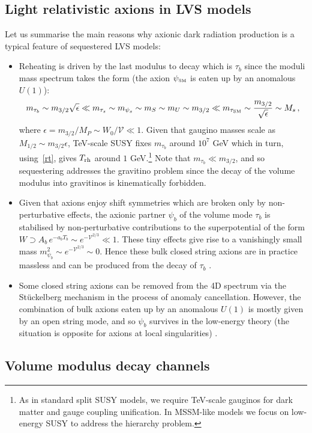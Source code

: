 \documentclass[11pt,a4paper]{article}
\newcommand{\bi}{\begin{itemize}}
\newcommand{\ei}{\end{itemize}}
\newcommand{\be}{\begin{equation}}
\newcommand{\ee}{\end{equation}}
\def\SM{{\scriptscriptstyle \rm SM}}
\newcommand\vo{{\mathcal{V}}}
\begin{document}
\subsection{Light relativistic axions in LVS models}

Let us summarise the main reasons why axionic dark radiation production is a typical feature of sequestered LVS models:
\bi
\item Reheating is driven by the last modulus to decay which is $\tau_b$ since the moduli mass spectrum takes the form (the axion $\psi_\SM$ is eaten up by an anomalous $U(1)$):
\be
m_{\tau_b}\sim m_{3/2} \sqrt{\epsilon} \ll m_{\tau_s} \sim m_{\psi_s} \sim m_S \sim m_U \sim m_{3/2} \ll m_{\tau_\SM} \sim \frac{m_{3/2}}{\sqrt{\epsilon}}\sim M_s\,,
\ee
where $\epsilon = m_{3/2}/M_P \sim W_0 / \vo \ll 1$. Given that gaugino masses scale as $M_{1/2}\sim m_{3/2} \epsilon$, TeV-scale SUSY fixes $m_{\tau_b}$ around $10^7$ GeV which in turn, using~\eqref{rt}, gives $T_{\rm rh}$ around $1$ GeV.\footnote{As in standard split SUSY models, we require TeV-scale gauginos for dark matter and gauge coupling unification. In MSSM-like models we focus on low-energy SUSY to address the hierarchy problem.} Note that $m_{\tau_b}\ll m_{3/2}$, and so sequestering addresses the gravitino problem since the decay of the volume modulus into gravitinos is kinematically forbidden.

\item Given that axions enjoy shift symmetries which are broken only by non-perturbative effects, the axionic partner $\psi_b$ of the volume mode $\tau_b$ is stabilised by non-perturbative contributions to the superpotential of the form $W \supset A_b\, e^{- a_b T_b} \sim e^{-\vo^{2/3}}\ll 1$. These tiny effects give rise to a vanishingly small mass $m_{\psi_b}^2 \sim e^{- \vo^{2/3}} \sim 0$. Hence these bulk closed string axions are in practice massless and can be produced from the decay of $\tau_b$ \cite{DR1, DR2}. 

\item Some closed string axions can be removed from the 4D spectrum via the St\"uckelberg mechanism in the process of anomaly cancellation. However, the combination of bulk axions eaten up by an anomalous $U(1)$ is mostly given by an open string mode, and so $\psi_b$ survives in the low-energy theory (the situation is opposite for axions at local singularities) \cite{DMDRcorr}. 
\ei

\subsection{Volume modulus decay channels}
\end{document}
